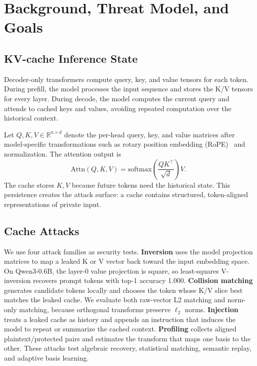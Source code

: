 \section{Background, Threat Model, and Goals}
\label{sec:background}

\subsection{KV-cache Inference State}

Decoder-only transformers compute query, key, and value tensors for each token. During prefill, the model processes the input sequence and stores the K/V tensors for every layer. During decode, the model computes the current query and attends to cached keys and values, avoiding repeated computation over the historical context.

Let $Q,K,V \in \mathbb{R}^{n \times d}$ denote the per-head query, key, and value matrices after model-specific transformations such as rotary position embedding (RoPE)~\cite{roformer} and normalization. The attention output is
\begin{equation}
    \mathrm{Attn}(Q,K,V)=\mathrm{softmax}\left(\frac{QK^\top}{\sqrt{d}}\right)V.
\end{equation}
The cache stores $K,V$ because future tokens need the historical state. This persistence creates the attack surface: a cache contains structured, token-aligned representations of private input.

\subsection{Cache Attacks}

We use four attack families as security tests. \textbf{Inversion} uses the model projection matrices to map a leaked K or V vector back toward the input embedding space. On Qwen3-0.6B, the layer-0 value projection is square, so least-squares V-inversion recovers prompt tokens with top-1 accuracy 1.000. \textbf{Collision matching} generates candidate tokens locally and chooses the token whose K/V slice best matches the leaked cache. We evaluate both raw-vector L2 matching and norm-only matching, because orthogonal transforms preserve $\ell_2$ norms. \textbf{Injection} treats a leaked cache as history and appends an instruction that induces the model to repeat or summarize the cached context. \textbf{Profiling} collects aligned plaintext/protected pairs and estimates the transform that maps one basis to the other. These attacks test algebraic recovery, statistical matching, semantic replay, and adaptive basis learning.

